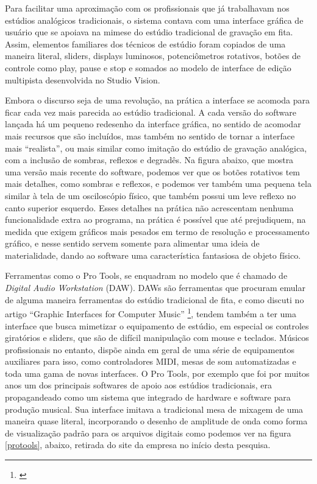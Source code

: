 Para facilitar uma aproximação com os profissionais que já trabalhavam nos estúdios analógicos tradicionais, o sistema contava com uma interface gráfica de usuário que se apoiava na mimese do estúdio tradicional de gravação em fita. Assim, elementos familiares dos técnicos de estúdio foram copiados de uma maneira literal, sliders, displays luminosos, potenciômetros rotativos, botões de controle como play, pause e stop e somados ao modelo de interface de edição multipista desenvolvida no Studio Vision. 

Embora o discurso seja de uma revolução, na prática a interface se acomoda para ficar cada vez mais parecida ao estúdio tradicional. A cada versão do software lançada há um pequeno redesenho da interface gráfica, no sentido de acomodar mais recursos que são incluídos, mas também no sentido de tornar a interface mais “realista”, ou mais similar como imitação do estúdio de gravação analógica, com a inclusão de sombras, reflexos e degradês. Na figura abaixo, que mostra uma versão mais recente do software, podemos ver que os botões rotativos tem mais detalhes, como sombras e reflexos, e podemos ver também uma pequena tela similar à tela de um osciloscópio físico, que também possui um leve reflexo no canto superior esquerdo. Esses detalhes na prática não acrescentam nenhuma funcionalidade extra ao programa, na prática é possível que até prejudiquem, na medida que exigem gráficos mais pesados em termo de resolução e processamento gráfico, e nesse sentido servem somente para alimentar uma ideia de materialidade, dando ao software uma característica fantasiosa de objeto físico. 

Ferramentas como o Pro Tools, se enquadram no modelo que é chamado de \emph{Digital Audio Workstation} (DAW). DAWs são ferramentas que procuram emular de alguma maneira ferramentas do estúdio tradicional de fita, e como discuti no artigo ``Graphic Interfaces for Computer Music'' \footnote{\cite{Stolfi2016}}, tendem também a ter uma interface que busca mimetizar o equipamento de estúdio, em especial os controles giratórios e sliders, que são de difícil manipulação com mouse e teclados. Músicos profissionais no entanto, dispõe ainda em geral de uma série de equipamentos auxiliares para isso, como controladores MIDI, mesas de som automatizadas e toda uma gama de novas interfaces. O Pro Tools, por exemplo que foi por muitos anos um dos principais softwares de apoio aos estúdios tradicionais, era propagandeado como um sistema que integrado de hardware e software para produção musical. Sua interface imitava a tradicional mesa de mixagem de uma maneira quase literal, incorporando o desenho de amplitude de onda como forma de visualização padrão para os arquivos digitais como podemos ver na figura \ref{protools}, abaixo, retirada do site da empresa no início desta pesquisa.


